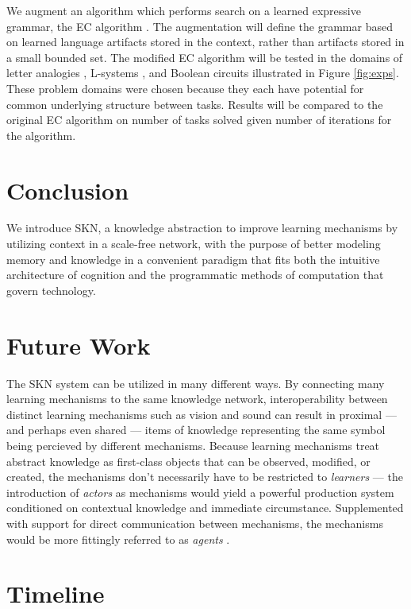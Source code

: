\documentclass[11pt,letterpaper]{article}
\begin{document}
\newpage
We augment an algorithm which performs search on a learned expressive
grammar, the EC algorithm \cite{dechter13}. The augmentation will define the
grammar based on learned language artifacts stored in the context, rather
than artifacts stored in a small bounded set. The modified EC algorithm will
be tested in the domains of letter analogies \cite{hofstadter94}, L-systems
\cite{rozenberg80}, and Boolean circuits illustrated in Figure
\ref{fig:exps}. These problem domains were chosen because they each have
potential for common underlying structure between tasks. Results will be
compared to the original EC algorithm on number of tasks solved given number
of iterations for the algorithm.


\section{Conclusion}

We introduce SKN, a knowledge abstraction to improve learning mechanisms by
utilizing context in a scale-free network, with the purpose of better
modeling memory and knowledge in a convenient paradigm that fits both the
intuitive architecture of cognition and the programmatic methods of
computation that govern technology.


\section{Future Work}

The SKN system can be utilized in many different ways. By connecting many
learning mechanisms to the same knowledge network, interoperability between
distinct learning mechanisms such as vision and sound can result in proximal
--- and perhaps even shared --- items of knowledge representing the same
symbol being percieved by different mechanisms. Because learning mechanisms
treat abstract knowledge as first-class objects that can be observed,
modified, or created, the mechanisms don't necessarily have to be restricted
to \emph{learners} --- the introduction of \emph{actors} as mechanisms would
yield a powerful production system conditioned on contextual knowledge and
immediate circumstance. Supplemented with support for direct communication
between mechanisms, the mechanisms would be more fittingly referred to as
\emph{agents} \cite{minsky88}.


\section{Timeline}
\end{document}
